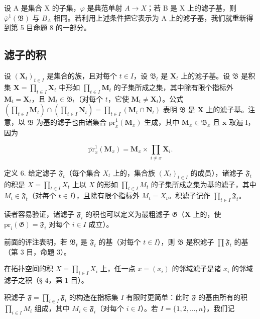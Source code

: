 设 A 是集合 X 的子集，\(\varphi\) 是典范单射 \(A \rightarrow X\)；若 B 是 X 上的滤子基，则 \(\overline{\varphi}^{1}(\mathfrak{B})\) 与 \(B_{A}\) 相同。若利用上述条件把它表示为 A 上的滤子基，我们就重新得到第 5 目命题 8 的一部分。

\subsection{滤子的积}

设 \((\mathbf{X}_t)_{t \in I}\) 是集合的族，且对每个 \(t \in I\)，设 \(\mathfrak{B}_t\) 是 \(\mathbf{X}_t\) 上的滤子基。设 \(\mathfrak{B}\) 是积集 \(\mathbf{X} = \prod_{t \in I} \mathbf{X}_t\) 中形如 \(\prod_{t \in I} \mathbf{M}_t\) 的子集所成之集，其中除有限个指标外 \(\mathbf{M}_t = \mathbf{X}_t\)，且 \(\mathbf{M}_t \in \mathfrak{B}_t\)（对每个 \(t\)，它使 \(\mathbf{M}_t \neq \mathbf{X}_t\)）。公式 \(\left(\prod_{t \in I} \mathbf{M}_t\right) \cap \left(\prod_{t \in I} \mathbf{N}_t\right) = \prod_{t \in I} (\mathbf{M}_t \cap \mathbf{N}_t)\) 表明 \(\mathfrak{B}\) 是 \(\mathbf{X}\) 上的滤子基。注意，以 \(\mathfrak{B}\) 为基的滤子也由诸集合 \(\overline{\mathrm{pr}}_x^1 (\mathbf{M}_x)\) 生成，其中 \(\mathbf{M}_x\in \mathfrak{B}_x\) 且 \(\pmb{x}\) 取遍 I，因为

\[
\overline {{\mathrm{pr}}} _ {x} ^ {1} \left(\mathbf {M} _ {x}\right) = \mathbf {M} _ {x} \times \prod_ {i \neq x} \mathbf {X} _ {i}.
\]

定义 6. 给定滤子 \(\mathfrak{F}_t\)（每个集合 \(X_t\) 上的，集合族 \((X_t)_{t \in I}\) 的成员），诸滤子 \(\mathfrak{F}_t\) 的积是 \(X = \prod_{t \in I} X_t\) 上以 \(X\) 的形如 \(\prod_{t \in I} M_t\) 的子集所成之集为基的滤子，其中 \(M_t \in \mathfrak{F}_t\)（对每个 \(t \in I\)），且除有限个指标外 \(M_t = X_t\)。积滤子记作 \(\prod_{t \in I} \mathfrak{F}_t\)。

读者容易验证，诸滤子 \(\mathfrak{F}_i\) 的积也可以定义为最粗滤子 \(\mathfrak{G}\)（\(\mathbf{X}\) 上的，使 \(\mathrm{pr}_i(\mathfrak{G}) = \mathfrak{F}_i\) 对每个 \(i \in I\) 成立）。

前面的评注表明，若 \(\mathfrak{B}_{t}\) 是 \(\mathfrak{F}_{t}\) 的基（对每个 \(t\in I\)），则 \(\mathfrak{B}\) 是积滤子 \(\prod \mathfrak{F}_{t}\) 的基（第 3 目，命题 3）。

在拓扑空间的积 \(X = \prod_{i \in I} X_i\) 上，任一点 \(x = (x_i)\) 的邻域滤子是诸 \(x_i\) 的邻域滤子之积（§ 4，第 1 目）。

积滤子 \(\mathfrak{F} = \prod_{i\in I}\mathfrak{F}_i\) 的构造在指标集 \(I\) 有限时更简单：此时 \(\mathfrak{F}\) 的基由所有的积 \(\prod_{i\in I}M_i\) 组成，其中 \(M_i\in \mathfrak{F}_i\)（对每个 \(i\in I\)）。若 \(I = \{1,2,\ldots,n\}\)，我们记

